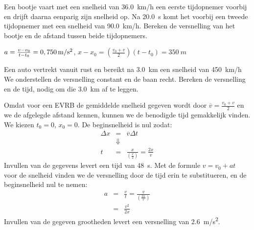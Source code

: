 \documentclass{ximera}
\begin{document}
\begin{exercise}
    Een bootje vaart met een snelheid van \SI{36,0}{km/h} een eerste tijdopnemer voorbij en drijft daarna eenparig zijn snelheid op. Na \SI{20,0}{s} komt het voorbij een tweede tijdopnemer met een snelheid van \SI{90,0}{km/h}. Bereken de versnelling van het bootje en de afstand tussen beide tijdopnemers.
    \begin{oplossing}
        $a=\frac{v-v_0}{t-t_0}=0,750\rm\,m/s^2$, $x-x_0=\left(\frac{v_0+v}{2}\right)(t-t_0)=\SI{350}{m}$
    \end{oplossing}
\end{exercise}

\begin{exercise}
    Een auto vertrekt vanuit rust en bereikt na \SI{3,0}{km} een snelheid van \SI{450}{km/h} We onderstellen de versnelling constant en de baan recht. Bereken de versnelling en de tijd, nodig om die \SI{3,0}{km} af te leggen.
\begin{oplossing}
    Omdat voor een EVRB de gemiddelde snelheid gegeven wordt door $\overline{v}=\frac{v_0+v}{2}$ en we de afgelegde afstand kennen, kunnen we de benodigde tijd gemakkelijk vinden. We kiezen $t_0=0$, $x_0=0$. De beginsnelheid is nul zodat:
    \begin{eqnarray*}
        \Delta x &=& \overline{v}\Delta t \\
        &\Downarrow & \\
        t &=& \frac{x}{\left(\frac{v}{2}\right)} = \frac{2x}{v}
    \end{eqnarray*}
    Invullen van de gegevens levert een tijd van \SI{48}{s}. Met de formule $v=v_0+at$ voor de snelheid vinden we de versnelling door de tijd erin te substitueren, en de beginsnelheid nul te nemen:
    \begin{eqnarray*}
        a &=& \frac{v}{t}=\frac{v}{\left(\frac{2x}{v}\right)}\\
        &=& \frac{v^2}{2x}
    \end{eqnarray*}
    Invullen van de gegeven grootheden levert een versnelling van \SI{2,6}{m/s^2}.
\end{oplossing}
\end{exercise}
\end{document}

